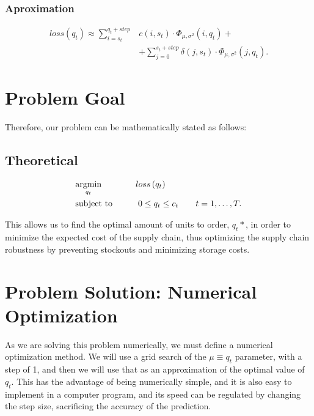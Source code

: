 \documentclass{OptiFlow}
\begin{document}
\subsubsection{Aproximation}
\begin{align*}
	loss\left( q_t \right)  \approx \sum_{i = s_t}^{q_t+step} &c\left( i,s_t \right) \cdot \Phi_{\mu, \sigma^2}\left( i, q_t \right) + \\
	&+ \sum_{j = 0}^{s_t + step} \delta\left( j,s_t \right) \cdot \Phi_{\mu, \sigma^2}\left( j,q_t \right) 
.\end{align*}

\section{Problem Goal}
Therefore, our problem can be mathematically stated as follows:
\subsection{Theoretical}
\begin{align*}
	&\underset{q_t}{\text{argmin}} \text{\qquad \qquad}loss\left( q_t \right)\\ 
	&\text{subject to}
		\text{\qquad\quad} 0 \le q_t \le  c_t \text{\qquad} t = 1,\ldots,T
.\end{align*}

This allows us to find the optimal amount of units to order, $q_t*$, in order to minimize the expected cost of the supply chain,
thus optimizing the supply chain robustness by preventing stockouts and minimizing storage costs.

\section{Problem Solution: Numerical Optimization}
As we are solving this problem numerically, we must define a numerical optimization method.
We will use a grid search of the $\mu \equiv q_t$ parameter, with a step of 1, and then we will use that as an approximation of the optimal value of $q_t$.
This has the advantage of being numerically simple, and it is also easy to implement in a computer program, and its speed can be 
regulated by changing the step size, sacrificing the accuracy of the prediction.
\end{document}
